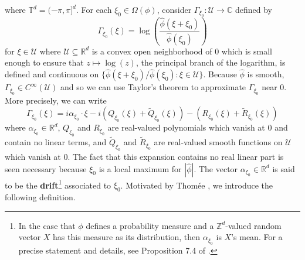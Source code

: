 \documentclass[11pt, letter]{book}
\begin{document}
where $\mathbb{T}^d=(-\pi,\pi]^d$. For each $\xi_0\in \Omega(\phi)$, consider $\Gamma_{\xi_0}:\mathcal{U}\to\mathbb{C}$ defined by
\begin{equation*}\Gamma_{\xi_0}(\xi)=\log\left(\frac{\widehat{\phi}(\xi+\xi_0)}{\widehat{\phi}(\xi_0)}\right)
\end{equation*}
for $\xi\in \mathcal{U}$ where $\mathcal{U}\subseteq\mathbb{R}^d$ is a convex open neighborhood of $0$ which is small enough to ensure that $z\mapsto\log(z)$, the principal branch of the logarithm, is defined and continuous on $\{\widehat{\phi}(\xi+\xi_0)/\widehat{\phi}(\xi_0):\xi\in\mathcal{U}\}$. Because $\widehat{\phi}$ is smooth, $\Gamma_{\xi_0}\in C^{\infty}(\mathcal{U})$ and so we can use Taylor's theorem to approximate $\Gamma_{\xi_0}$ near $0$. More precisely, we can write
\begin{equation}\label{eq:GammaExpansion}
    \Gamma_{\xi_0}(\xi)=i\alpha_{\xi_0}\cdot\xi -i\left(Q_{\xi_0}(\xi)+\widetilde{Q}_{\xi_0}(\xi)\right)-\left(R_{\xi_0}(\xi)+\widetilde{R}_{\xi_0}(\xi)\right)
\end{equation}
where $\alpha_{\xi_0}\in\mathbb{R}^d$, $Q_{\xi_0}$ and $R_{\xi_0}$ are real-valued polynomials which vanish at $0$ and contain no linear terms, and $\widetilde{Q}_{\xi_0}$ and $\widetilde{R}_{\xi_0}$ are real-valued smooth functions on $\mathcal{U}$ which vanish at $0$. The fact that this expansion contains no real linear part is seen necessary because $\xi_0$ is a local maximum for $|\widehat{\phi}|$. The vector $\alpha_{\xi_0}\in\mathbb{R}^d$ is said to be the \textbf{drift}\footnote{In the case that $\phi$ defines a probability measure and a $\mathbb{Z}^d$-valued random vector $X$ has this measure as its distribution, then $\alpha_{\xi_0}$ is $X$'s mean. For a precise statement and details, see Proposition 7.4 of \cite{randles_convolution_2017}.} associated to $\xi_0$. Motivated by Thom\'{e}e \cite{thomee_stability_1965}, we introduce the following definition. 
\end{document}
